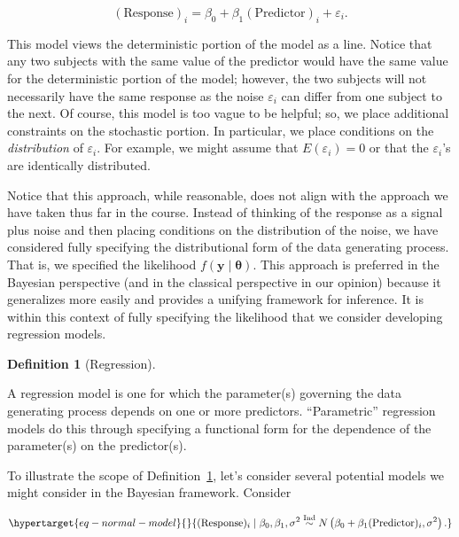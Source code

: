 \documentclass[
  letterpaper,
  DIV=11,
  numbers=noendperiod]{scrreprt}
\theoremstyle{definition}
\newtheorem{definition}{Definition}[chapter]
\theoremstyle{plain}
\theoremstyle{definition}
\theoremstyle{remark}
\begin{document}
\[(\text{Response})_i = \beta_0 + \beta_1 (\text{Predictor})_i + \varepsilon_i.\]

This model views the deterministic portion of the model as a line.
Notice that any two subjects with the same value of the predictor would
have the same value for the deterministic portion of the model; however,
the two subjects will not necessarily have the same response as the
noise \(\varepsilon_i\) can differ from one subject to the next. Of
course, this model is too vague to be helpful; so, we place additional
constraints on the stochastic portion. In particular, we place
conditions on the \emph{distribution} of \(\varepsilon_i\). For example,
we might assume that \(E\left(\varepsilon_i\right) = 0\) or that the
\(\varepsilon_i\)'s are identically distributed.

Notice that this approach, while reasonable, does not align with the
approach we have taken thus far in the course. Instead of thinking of
the response as a signal plus noise and then placing conditions on the
distribution of the noise, we have considered fully specifying the
distributional form of the data generating process. That is, we
specified the likelihood \(f(\mathbf{y} \mid \boldsymbol{\theta})\).
This approach is preferred in the Bayesian perspective (and in the
classical perspective in our opinion) because it generalizes more easily
and provides a unifying framework for inference. It is within this
context of fully specifying the likelihood that we consider developing
regression models.

\begin{definition}[Regression]\protect\hypertarget{def-regression}{}\label{def-regression}

A regression model is one for which the parameter(s) governing the data
generating process depends on one or more predictors. ``Parametric''
regression models do this through specifying a functional form for the
dependence of the parameter(s) on the predictor(s).

\end{definition}

To illustrate the scope of Definition~\ref{def-regression}, let's
consider several potential models we might consider in the Bayesian
framework. Consider

\begin{equation}\protect\hypertarget{eq-normal-model}{}{(\text{Response})_i \mid \beta_0, \beta_1, \sigma^2 \stackrel{\text{Ind}}{\sim}N\left(\beta_0 + \beta_1 (\text{Predictor})_i, \sigma^2\right).}\label{eq-normal-model}\end{equation}
\end{document}
